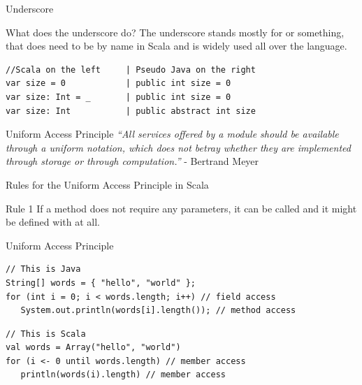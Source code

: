 \begin{frame}[fragile]{Underscore}
\begin{block}{What does the underscore do?}
The underscore stands mostly for  or something,
that does  need to be  by name in Scala
and is widely used all over the language.
\end{block}
\begin{lstlisting}
//Scala on the left     | Pseudo Java on the right
var size = 0            | public int size = 0
var size: Int = _       | public int size = 0
var size: Int           | public abstract int size
\end{lstlisting}
\end{frame}

\begin{frame}[fragile]{Uniform Access Principle}
\pause
\emph{``All services offered by a module should be available through a uniform
notation, which does not betray whether they are implemented through storage or
through computation.''} - Bertrand Meyer
\end{frame}

\begin{frame}[fragile]{Rules for the Uniform Access Principle in Scala}
\begin{block}{Rule 1}
If a method does not require any parameters, it can be called  and it might be defined with  at
all.
\end{block}
\pause
\begin{exampleblock}{Uniform Access Principle}
\begin{lstlisting}
// This is Java
String[] words = { "hello", "world" };
for (int i = 0; i < words.length; i++) // field access
   System.out.println(words[i].length()); // method access
\end{lstlisting}
\pause
\begin{lstlisting}
// This is Scala
val words = Array("hello", "world")
for (i <- 0 until words.length) // member access
   println(words(i).length) // member access
\end{lstlisting}
\end{exampleblock}
\end{frame}

